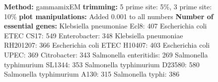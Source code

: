 \documentclass[a4paper,10pt]{article}
\begin{document}
\begin{figure}
{\textbf{Method:} gammamixEM \newline
\textbf{trimming:} 5 prime site: 5\%, 3 prime site: 10\%\newline
\textbf{plot manipulations:} Added 0.001 to all numbers \newline
\textbf{Number of essential genes:}\newline
Klebsiella pneumoniae Ecl8: 407 \newline
Escherichia coli ETEC CS17: 549 \newline
Enterobacter: 348 \newline
Klebsiella pneumoniae RH201207: 366 \newline
Escherichia coli ETEC H10407: 403 \newline
Escherichia coli UPEC: 369 \newline
Citrobacter: 343 \newline
Salmonella enteritidis: 269 \newline
Salmonella typhimurium SL1344: 353 \newline
Salmonella typhimurium D23580: 580 \newline
Salmonella typhimurium A130: 315 \newline
Salmonella typhi: 386}
\end{figure}
\end{document}
